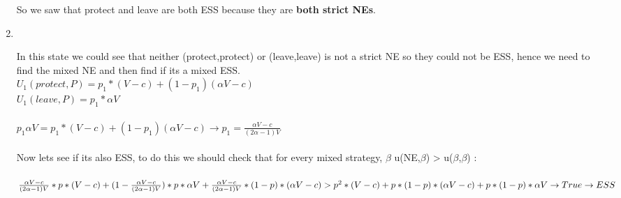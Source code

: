 \begin{enumerate}
\begin{latin}
              So we saw that protect and leave are both ESS because they are \textbf{both strict NEs}.
          \end{latin}
    \item \phantom{text}
          \\
          \begin{latin}
              \noindent
              In this state we could see that neither (protect,protect) or (leave,leave) is not a strict NE so they could not be ESS, hence we need to find the mixed NE and then find if its a mixed ESS.\\
              $U_1(protect,P) = p_1 * (V-c) + (1-p_1)(\alpha V -c )$\\
              $U_1(leave,P) = p_1 * \alpha V $\\\\
              $p_1 \alpha V = p_1 * (V-c) + (1-p_1)(\alpha V - c ) \rightarrow p_1 = \frac{\alpha V -c }{(2\alpha - 1)V}$\\\\
              Now lets see if its also ESS, to do this we should check that for every mixed strategy, $\beta$ u(NE,$\beta$) > u($\beta$,$\beta$) : \\\\
              $\frac{\alpha V -c }{(2\alpha - 1)V} * p * (V-c) + (1 - \frac{\alpha V -c }{(2\alpha - 1)V})*p*\alpha V + \frac{\alpha V -c }{(2\alpha - 1)V}*(1-p)*(\alpha V -c) > \\ p^2 * (V-c) + p*(1-p)*(\alpha V -c) + p * (1-p) * \alpha V \\
              \rightarrow True \rightarrow ESS$
          \end{latin}
\end{enumerate}
